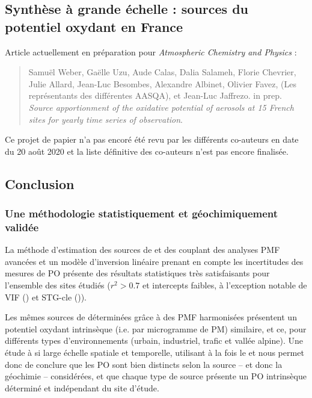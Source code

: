 \subsection{Synthèse à grande échelle : sources du potentiel oxydant en France}%
\label{sub:article}

\begin{tcolorbox}[colback=red!5!white,colframe=Melon,title=Note]
Article actuellement en préparation pour \textit{Atmospheric Chemistry and Physics} :
\begin{quote}
    Samuël Weber, Gaëlle Uzu, Aude Calas, Dalia Salameh, Florie Chevrier, Julie Allard,
    Jean-Luc Besombes, Alexandre Albinet, Olivier Favez, (Les représentants des différentes AASQA), et
    Jean-Luc Jaffrezo. in prep.
    \textit{Source apportionment of the oxidative potential of aerosols at 15 French
    sites for yearly time series of observation}.
\end{quote}
Ce projet de papier n'a pas encoré été revu par les différents co-auteurs en date du 20
août 2020 et la liste définitive des co-auteurs n'est pas encore finalisée.
\end{tcolorbox}

\clearpage


\subsection{Conclusion}%
\label{sec:conclusion_synthèse_OP}

\subsubsection{Une méthodologie statistiquement et géochimiquement validée}%
\label{ssub:une_méthodologie_statistiquement_et_géochimiquement_validée}

La méthode d'estimation des sources de \POAA{} et \PODTT{} des \PMdix{} couplant des
analyses PMF avancées et un modèle d'inversion linéaire prenant en compte les incertitudes
des mesures de PO présente des résultats statistiques très satisfaisants pour l'ensemble
des sites étudiés ($r^2>0.7$ et intercepts faibles, à l'exception notable de VIF (\PODTT) et
STG-cle (\POAA)).

Les mêmes sources de \PMdix{} déterminées grâce à des PMF harmonisées présentent un potentiel
oxydant intrinsèque (i.e. par microgramme de PM) similaire, et ce, pour différents types
d'environnements (urbain, industriel, trafic et vallée alpine). Une étude à si large
échelle spatiale et temporelle, utilisant à la fois le \POAA{} et \PODTT{} nous permet
donc de conclure que les PO sont bien distincts selon la source -- et donc la géochimie --
considérées, et que chaque type de source présente un PO intrinsèque déterminé et
indépendant du site d'étude.

